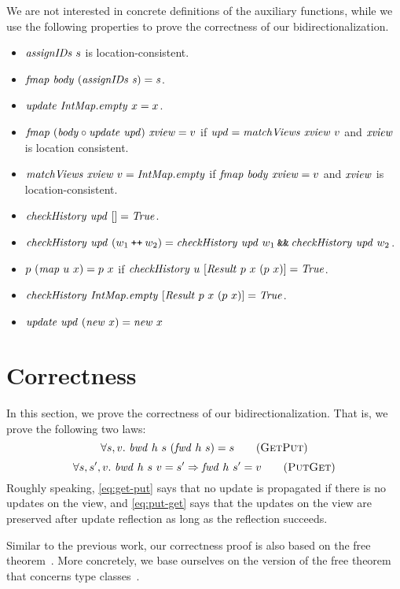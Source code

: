 \documentclass{article}
\theoremstyle{definition}
\newcommand{\APPEND}{\mathbin{\texttt{++}}}
\begin{document}
We are not interested in concrete definitions of the auxiliary functions, while
we use the following properties to prove the correctness of our 
bidirectionalization.
\begin{itemize}
 \item $\mathit{assignIDs}~s$ is location-consistent.
 \item $\mathit{fmap}~\mathit{body}~(\mathit{assignIDs}~\mathit{s}) = \mathit{s}$.
 \item $\mathit{update}~\mathit{IntMap.empty}~x = x$. %
 \item $\mathit{fmap}~(\mathit{body} \circ \mathit{update}~\mathit{upd})~\mathit{xview} = v$
    if $\mathit{upd} = \mathit{matchViews}~\mathit{xview}~v$ and $\mathit{xview}$ is location consistent.
 \item  
     $\mathit{matchViews}~\mathit{xview}~v = \mathit{IntMap.empty}$
   if $\mathit{fmap}~\mathit{body}~\mathit{xview} = v$ and $\mathit{xview}$ is location-consistent. 
 \item $\mathit{checkHistory}~\mathit{upd}~[] = \mathit{True}$.
 \item $\mi{checkHistory}~\mi{upd}~(w_1 \APPEND w_2) = \mi{checkHistory}~\mi{upd}~w_1 \mathbin{\texttt{\&\&}} \mi{checkHistory}~\mi{upd}~w_2$.
 \item $p~(\mathit{map}~u~x) = p~x$
    if $\mathit{checkHistory}~u~[\mathit{Result}~p~x~(p~x)] = \mathit{True}$.
 \item $\mathit{checkHistory}~\mathit{IntMap.empty}~[\mathit{Result}~p~x~(p~x)] = \mathit{True}$.
 \item $\mathit{update}~\mathit{upd}~(\mathit{new}~x) = \mathit{new}~x$
\end{itemize}


\section{Correctness}
In this section, we prove the correctness of our bidirectionalization.
That is, we prove the following two laws:
\[
  \forall s,v.~ \mi{bwd}~h~s~(\mi{fwd}~h~s) = s \tag{\textsc{GetPut}}
  \label{eq:get-put}
\]
\[
\forall s,s',v.~ \mi{bwd}~h~s~v = s' \Rightarrow \mi{fwd}~h~s' = v \tag{\textsc{PutGet}}
 \label{eq:put-get}
\]
Roughly speaking, \ref{eq:get-put} says that no update is propagated if there is no updates on the view, and \ref{eq:put-get} says that the updates on the view are preserved after update reflection as long as the reflection succeeds. 


Similar to the previous work, our correctness proof is also based on the free theorem~\cite{Wadler89}. More concretely, we base ourselves on the version of the free theorem that concerns type classes~\cite{Voigtlander09ft}.
\end{document}
